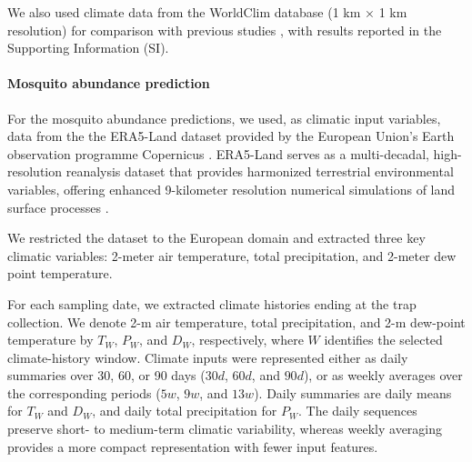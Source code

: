\documentclass[preprint,12pt]{elsarticle}
\begin{document}
We also used climate data from the WorldClim database \cite{worldclim_2023} (1 km × 1 km resolution) for comparison with previous studies \cite{zardini2024}, with results reported in the Supporting Information (SI).

\paragraph{Mosquito abundance prediction}
For the mosquito abundance predictions, we used, as climatic input variables, data from the the ERA5-Land dataset provided by the European Union's Earth observation programme Copernicus \cite{copernicus_2025}. ERA5-Land serves as a multi-decadal, high-resolution reanalysis dataset that provides harmonized terrestrial environmental variables, offering enhanced 9-kilometer resolution numerical simulations of land surface processes  \cite{ERA5land2019}.

We restricted the dataset to the European domain and extracted three key climatic variables: 2-meter air temperature, total precipitation, and 2-meter dew point temperature.

For each sampling date, we extracted climate histories ending at the trap collection. We denote 2-m air temperature, total precipitation, and 2-m dew-point temperature by $T_W$, $P_W$, and $D_W$, respectively, where $W$ identifies the selected climate-history window. Climate inputs were represented either as daily summaries over 30, 60, or 90 days ($30d$, $60d$, and $90d$), or as weekly averages over the corresponding periods ($5w$, $9w$, and $13w$). Daily summaries are daily means for $T_W$ and $D_W$, and daily total precipitation for $P_W$. The daily sequences preserve short- to medium-term climatic variability, whereas weekly averaging provides a more compact representation with fewer input features.
\end{document}

